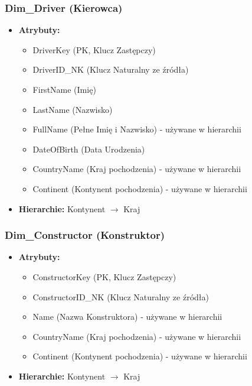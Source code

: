 \documentclass[a4paper,12pt]{article}
\begin{document}
\subsubsection{Dim\_Driver (Kierowca)}
\begin{itemize}
  \item \textbf{Atrybuty:}
        \begin{itemize}
          \item DriverKey (PK, Klucz Zastępczy)
          \item DriverID\_NK (Klucz Naturalny ze źródła)
          \item FirstName (Imię)
          \item LastName (Nazwisko)
          \item FullName (Pełne Imię i Nazwisko) - używane w hierarchii
          \item DateOfBirth (Data Urodzenia)
          \item CountryName (Kraj pochodzenia) - używane w hierarchii
          \item Continent (Kontynent pochodzenia) - używane w hierarchii
        \end{itemize}
  \item \textbf{Hierarchie:} Kontynent $\rightarrow$ Kraj
\end{itemize}

\subsubsection{Dim\_Constructor (Konstruktor)}
\begin{itemize}
  \item \textbf{Atrybuty:}
        \begin{itemize}
          \item ConstructorKey (PK, Klucz Zastępczy)
          \item ConstructorID\_NK (Klucz Naturalny ze źródła)
          \item Name (Nazwa Konstruktora) - używane w hierarchii
          \item CountryName (Kraj pochodzenia) - używane w hierarchii
          \item Continent (Kontynent pochodzenia) - używane w hierarchii
        \end{itemize}
  \item \textbf{Hierarchie:} Kontynent $\rightarrow$ Kraj
\end{itemize}
\end{document}
